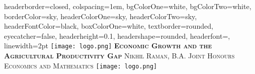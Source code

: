 \documentclass[landscape,a0paper, fontscale = 0.285]{baposter} %
\begin{document}
\begin{poster}
{
headerborder=closed, %
colspacing=1em, %
bgColorOne=white, %
bgColorTwo=white, %
borderColor=sky, %
headerColorOne=sky, %
headerColorTwo=sky, %
headerFontColor=black, %
boxColorOne=white, %
textborder=rounded, %
eyecatcher=false, %
headerheight=0.1\textheight, %
headershape=rounded, %
headerfont=\large\sc, %
linewidth=2pt %
}
%
{\texttt{[image: logo.png]}} %
{\huge\bf\textsc{Economic Growth and the Agricultural Productivity Gap}\vspace{0.5em}} %
{\textsc{Nikhil Raman, B.A. Joint Honours Economics and Mathematics}} %
{\texttt{[image: logo.png]}} %



\end{poster}
\end{document}
